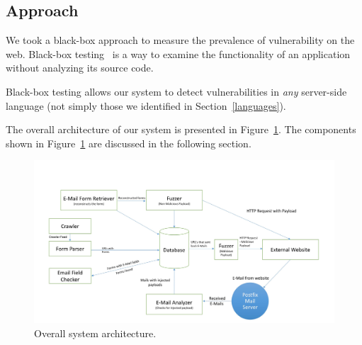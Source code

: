 \subsection{Approach}
\label{sys:appr}
We took a black-box approach to measure the prevalence of \ehi vulnerability on the web. Black-box testing~\cite{Beizer:1995:BTT:202699} is a way to examine the functionality of an application without analyzing its source code.

Black-box testing allows our system to detect \ehi vulnerabilities in \emph{any} server-side language (not simply those we identified in Section~\ref{languages}).

The overall architecture of our system is presented in Figure~\ref{fig:overall}. The components shown in Figure~\ref{fig:overall} are discussed in the following section.

\begin{figure}
	\centering
	\includegraphics[width=.8\textwidth]{overall}
	\caption{Overall system architecture.}
	\label{fig:overall}
\end{figure}
